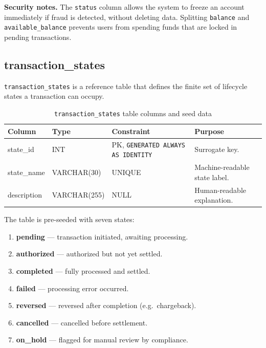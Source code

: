 \noindent\textbf{Security notes.}
The \texttt{status} column allows the system to freeze an account immediately if fraud is detected, without deleting data. Splitting \texttt{balance} and \texttt{available\_balance} prevents users from spending funds that are locked in pending transactions.

\subsection{transaction\_states}
\label{sec:tbl-txstates}

\texttt{transaction\_states} is a reference table that defines the finite set of lifecycle states a transaction can occupy.

\begin{table}[htbp]
  \centering
  \caption{\texttt{transaction\_states} table columns and seed data}
  \label{tab:txstates}
  \small
  \setlength{\tabcolsep}{4pt}
  \renewcommand{\arraystretch}{1.15}
  \begin{tabularx}{\textwidth}{@{} l l l X @{}}
    \toprule
    \textbf{Column} & \textbf{Type} & \textbf{Constraint} & \textbf{Purpose} \\
    \midrule
    state\_id    & INT          & PK, \texttt{GENERATED ALWAYS AS IDENTITY} & Surrogate key. \\
    state\_name  & VARCHAR(30)  & UNIQUE       & Machine-readable state label. \\
    description  & VARCHAR(255) & NULL         & Human-readable explanation. \\
    \bottomrule
  \end{tabularx}
\end{table}

\noindent The table is pre-seeded with seven states:

\begin{enumerate}
  \item \textbf{pending} --- transaction initiated, awaiting processing.
  \item \textbf{authorized} --- authorized but not yet settled.
  \item \textbf{completed} --- fully processed and settled.
  \item \textbf{failed} --- processing error occurred.
  \item \textbf{reversed} --- reversed after completion (e.g.\ chargeback).
  \item \textbf{cancelled} --- cancelled before settlement.
  \item \textbf{on\_hold} --- flagged for manual review by compliance.
\end{enumerate}

